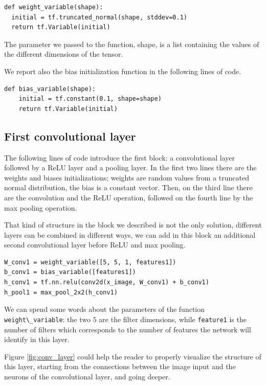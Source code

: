 \begin{lstlisting}
def weight_variable(shape):
  initial = tf.truncated_normal(shape, stddev=0.1)
  return tf.Variable(initial)
\end{lstlisting}

The parameter we passed to the function, shape, is a list containing the values of the different dimensions of the tensor.

We report also the bias initialization function in the following lines of code.

\begin{lstlisting}
def bias_variable(shape):
	initial = tf.constant(0.1, shape=shape)
	return tf.Variable(initial)
\end{lstlisting}

\subsection{First convolutional layer}

The following lines of code introduce the first block: a convolutional layer followed by a \acs{ReLU} layer and a pooling layer. In the first two lines there are the weights and biases initializations; weights are random values from a truncated normal distribution, the bias is a constant vector. Then, on the third line there are the convolution and the \acs{ReLU} operation, followed on the fourth line by the max pooling operation.

That kind of structure in the block we described is not the only solution, different layers can be combined in different ways, \eg we can add in this block an additional second convolutional layer before ReLU and max pooling.

\begin{lstlisting}
W_conv1 = weight_variable([5, 5, 1, features1])
b_conv1 = bias_variable([features1])
h_conv1 = tf.nn.relu(conv2d(x_image, W_conv1) + b_conv1)
h_pool1 = max_pool_2x2(h_conv1)
\end{lstlisting}

We can spend some words about the parameters of the function \lstinline|weight\_variable|: the two $5$ are the filter dimensions, while \lstinline|feature1| is the number of filters which corresponds to the number of features the network will identify in this layer.

Figure \ref{fig:conv_layer} could help the reader to properly visualize the structure of this layer, starting from the connections between the image input and the neurons of the convolutional layer, and going deeper.

